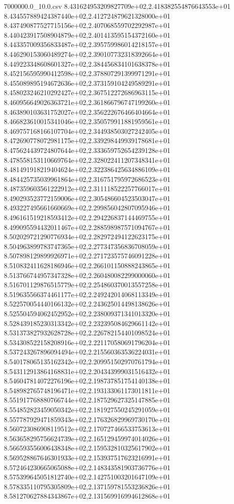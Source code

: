 \begin{filecontents*}{7000000.0_10.0.csv}
8.431624953209827709e+02,2.418382554876643553e+01
8.434557889424387440e+02,2.412724879621328000e+01
8.437490877527715156e+02,2.407068559702292987e+01
8.440423917508904879e+02,2.401413595154372160e+01
8.443357009356833487e+02,2.395759986014218157e+01
8.446290153060489274e+02,2.390107732318392664e+01
8.449223348608601327e+02,2.384456834101638378e+01
8.452156595990412598e+02,2.378807291399971291e+01
8.455089895194672636e+02,2.373159104249589291e+01
8.458023246210292427e+02,2.367512272686963115e+01
8.460956649026363721e+02,2.361866796747199260e+01
8.463890103631752027e+02,2.356222676466404664e+01
8.466823610015341046e+02,2.350579911881959561e+01
8.469757168166107704e+02,2.344938503027242405e+01
8.472690778072981175e+02,2.339298449939178681e+01
8.475624439724807644e+02,2.333659752654239128e+01
8.478558153110669764e+02,2.328022411207348341e+01
8.481491918219404624e+02,2.322386425634886109e+01
8.484425735039961864e+02,2.316751795972686523e+01
8.487359603561222912e+02,2.311118522257766017e+01
8.490293523772159006e+02,2.305486604523503047e+01
8.493227495661660669e+02,2.299856042807095946e+01
8.496161519218593412e+02,2.294226837144469755e+01
8.499095594432011467e+02,2.288598987571094767e+01
8.502029721290776934e+02,2.282972494122623175e+01
8.504963899783747365e+02,2.277347356836708059e+01
8.507898129899926971e+02,2.271723575746091228e+01
8.510832411628186946e+02,2.266101150888243865e+01
8.513766744957347328e+02,2.260480082299000060e+01
8.516701129876515779e+02,2.254860370013557258e+01
8.519635566374461177e+02,2.249242014068113349e+01
8.522570054440166132e+02,2.243625014498138626e+01
8.525504594062452952e+02,2.238009371341013320e+01
8.528439185230313342e+02,2.232395084629661142e+01
8.531373827932628728e+02,2.226782154401098524e+01
8.534308522158208916e+02,2.221170580691796204e+01
8.537243267896094494e+02,2.215560363536224031e+01
8.540178065135162342e+02,2.209951502970761794e+01
8.543112913864168831e+02,2.204343999031516432e+01
8.546047814072276196e+02,2.198737851754140138e+01
8.548982765748196471e+02,2.193133061173011811e+01
8.551917768880766744e+02,2.187529627325147885e+01
8.554852823459050342e+02,2.181927550245291059e+01
8.557787929471859343e+02,2.176326829969730170e+01
8.560723086908119512e+02,2.170727466533753613e+01
8.563658295756624739e+02,2.165129459974014026e+01
8.566593556006438348e+02,2.159532810325617902e+01
8.569528867646301933e+02,2.153937517623216991e+01
8.572464230665065088e+02,2.148343581903736776e+01
8.575399645051812740e+02,2.142751003201647109e+01
8.578335110795305809e+02,2.137159781553236826e+01
8.581270627884343867e+02,2.131569916994612868e+01

\end{filecontents*}
